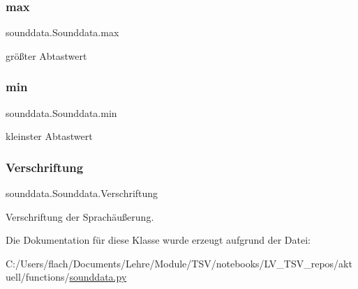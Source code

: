 \subsubsection{\texorpdfstring{max}{max}}
{\footnotesize\ttfamily sounddata.\+Sounddata.\+max}



größter Abtastwert 

\mbox{\label{classsounddata_1_1_sounddata_a57cdccd0a2cae0a3f39b7a40a6f1d5f8}} 
\subsubsection{\texorpdfstring{min}{min}}
{\footnotesize\ttfamily sounddata.\+Sounddata.\+min}



kleinster Abtastwert 

\mbox{\label{classsounddata_1_1_sounddata_a9a4ef06c4e02480837e12b98e1e75bfe}} 
\subsubsection{\texorpdfstring{Verschriftung}{Verschriftung}}
{\footnotesize\ttfamily sounddata.\+Sounddata.\+Verschriftung}



Verschriftung der Sprachäußerung. 



Die Dokumentation für diese Klasse wurde erzeugt aufgrund der Datei\+:\begin{DoxyCompactItemize}
\item 
C\+:/\+Users/flach/\+Documents/\+Lehre/\+Module/\+T\+S\+V/notebooks/\+L\+V\+\_\+\+T\+S\+V\+\_\+repos/aktuell/functions/\mbox{\hyperlink{sounddata_8py}{sounddata.\+py}}\end{DoxyCompactItemize}
